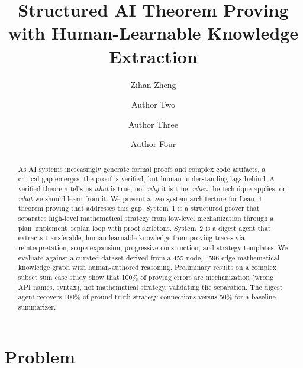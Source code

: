 \documentclass[sigconf]{acmart}
\begin{document}
\title{Structured AI Theorem Proving with Human-Learnable Knowledge Extraction}

\author{Zihan Zheng}

\author{Author Two}

\author{Author Three}

\author{Author Four}

\begin{abstract}
As AI systems increasingly generate formal proofs and complex code artifacts, a critical gap emerges: the proof is verified, but human understanding lags behind. A verified theorem tells us \emph{what} is true, not \emph{why} it is true, \emph{when} the technique applies, or \emph{what} we should learn from it. We present a two-system architecture for Lean~4 theorem proving that addresses this gap. System~1 is a structured prover that separates high-level mathematical strategy from low-level mechanization through a plan--implement--replan loop with proof skeletons. System~2 is a digest agent that extracts transferable, human-learnable knowledge from proving traces via reinterpretation, scope expansion, progressive construction, and strategy templates. We evaluate against a curated dataset derived from a 455-node, 1596-edge mathematical knowledge graph with human-authored reasoning. Preliminary results on a complex subset sum case study show that 100\% of proving errors are mechanization (wrong API names, syntax), not mathematical strategy, validating the separation. The digest agent recovers 100\% of ground-truth strategy connections versus 50\% for a baseline summarizer.
\end{abstract}

\maketitle

\section{Problem}

\end{document}
